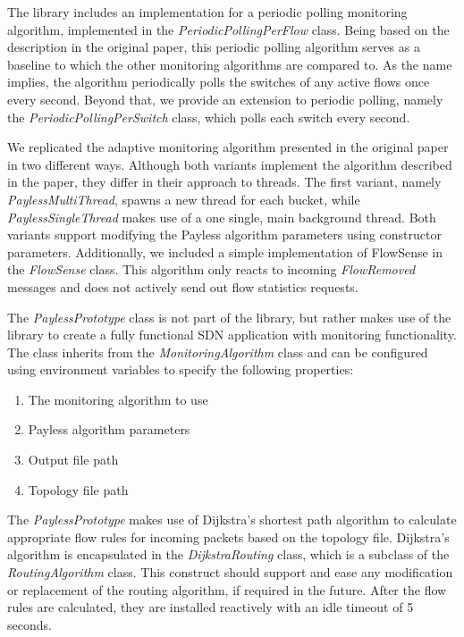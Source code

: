 \documentclass[DIV=12]{scrartcl}
\begin{document}
The library includes an implementation for a periodic polling monitoring algorithm, implemented in the \textit{PeriodicPollingPerFlow} class. Being based on the description in the original paper, this periodic polling algorithm serves as a baseline to which the other monitoring algorithms are compared to. As the name implies, the algorithm periodically polls the switches of any active flows once every second. Beyond that, we provide an extension to periodic polling, namely the \textit{PeriodicPollingPerSwitch} class, which polls each switch every second.

We replicated the adaptive monitoring algorithm presented in the original paper in two different ways. Although both variants implement the algorithm described in the paper, they differ in their approach to threads.
The first variant, namely \textit{PaylessMultiThread}, spawns a new thread for each bucket, while \textit{PaylessSingleThread} makes use of a one single, main background thread. Both variants support modifying the Payless algorithm parameters using constructor parameters. Additionally, we included a simple implementation of FlowSense \cite{g3.yu2013flowsense} in the \textit{FlowSense} class. This algorithm only reacts to incoming \textit{FlowRemoved} messages and does not actively send out flow statistics requests. 

The \textit{PaylessPrototype} class is not part of the library, but rather makes use of the library to create a fully functional SDN application with monitoring functionality.
The class inherits from the \textit{MonitoringAlgorithm} class and can be configured using environment variables to specify the following properties:

\begin{enumerate}
    \item The monitoring algorithm to use
    \item Payless algorithm parameters
    \item Output file path
    \item Topology file path
\end{enumerate}

The \textit{PaylessPrototype} makes use of Dijkstra's shortest path algorithm to calculate appropriate flow rules for incoming packets based on the topology file. Dijkstra's algorithm is encapsulated in the \textit{DijkstraRouting} class, which is a subclass of the \textit{RoutingAlgorithm} class. This construct should support and ease any modification or replacement of the routing algorithm, if required in the future. After the flow rules are calculated, they are installed reactively with an idle timeout of 5 seconds.
\end{document}
